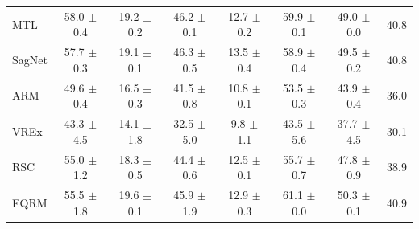 \documentclass{article}
\begin{document}
\begin{center}
{\begin{tabular}{lccccccc}
MTL                  & 58.0 $\pm$ 0.4       & 19.2 $\pm$ 0.2       & 46.2 $\pm$ 0.1       & 12.7 $\pm$ 0.2       & 59.9 $\pm$ 0.1       & 49.0 $\pm$ 0.0       & 40.8                 \\
SagNet               & 57.7 $\pm$ 0.3       & 19.1 $\pm$ 0.1       & 46.3 $\pm$ 0.5       & 13.5 $\pm$ 0.4       & 58.9 $\pm$ 0.4       & 49.5 $\pm$ 0.2       & 40.8                 \\
ARM                  & 49.6 $\pm$ 0.4       & 16.5 $\pm$ 0.3       & 41.5 $\pm$ 0.8       & 10.8 $\pm$ 0.1       & 53.5 $\pm$ 0.3       & 43.9 $\pm$ 0.4       & 36.0                 \\
VREx                 & 43.3 $\pm$ 4.5       & 14.1 $\pm$ 1.8       & 32.5 $\pm$ 5.0       & 9.8 $\pm$ 1.1        & 43.5 $\pm$ 5.6       & 37.7 $\pm$ 4.5       & 30.1                 \\
RSC                  & 55.0 $\pm$ 1.2       & 18.3 $\pm$ 0.5       & 44.4 $\pm$ 0.6       & 12.5 $\pm$ 0.1       & 55.7 $\pm$ 0.7       & 47.8 $\pm$ 0.9       & 38.9                 \\ \midrule
EQRM                 & 55.5 $\pm$ 1.8       & 19.6 $\pm$ 0.1       & 45.9 $\pm$ 1.9       & 12.9 $\pm$ 0.3       & 61.1 $\pm$ 0.0       & 50.3 $\pm$ 0.1       & 40.9                 \\
\bottomrule
\end{tabular}}
\end{center}
\end{document}
